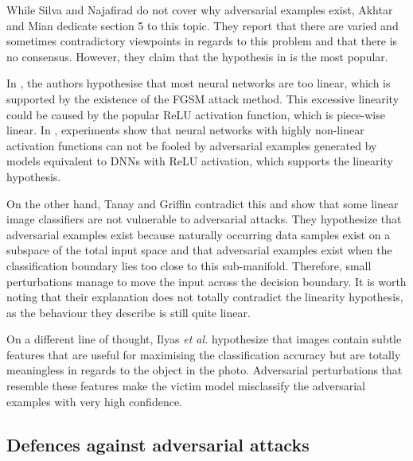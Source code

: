 While Silva and Najafirad \cite{silva_survey} do not cover why adversarial examples exist, Akhtar and Mian \cite{akhtar} dedicate section 5 to this topic. They report that there are varied and sometimes contradictory viewpoints in regards to this problem and that there is no consensus. However, they claim that the hypothesis in \cite{fgsm} is the most popular.

In \cite{fgsm}, the authors hypothesise that most neural networks are too linear, which is supported by the existence of the FGSM attack method. This excessive linearity could be caused by the popular ReLU activation function, which is piece-wise linear. In \cite{krotov2018dam}, experiments show that neural networks with highly non-linear activation functions can not be fooled by adversarial examples generated by models equivalent to DNNs with ReLU activation, which supports the linearity hypothesis. 

On the other hand, Tanay and Griffin \cite{tanay2016boundary} contradict this and show that some linear image classifiers are not vulnerable to adversarial attacks. They hypothesize that adversarial examples exist because naturally occurring data samples exist on a subspace of the total input space and that adversarial examples exist when the classification boundary lies too close to this sub-manifold. Therefore, small perturbations manage to move the input across the decision boundary. It is worth noting that their explanation does not totally contradict the linearity hypothesis, as the behaviour they describe is still quite linear.

On a different line of thought, Ilyas \textit{et al.} \cite{adv_examples_bugs} hypothesize that images contain subtle features that are useful for maximising the classification accuracy but are totally meaningless in regards to the object in the photo. Adversarial perturbations that resemble these features make the victim model misclassify the adversarial examples with very high confidence.

\subsection{Defences against adversarial attacks}

